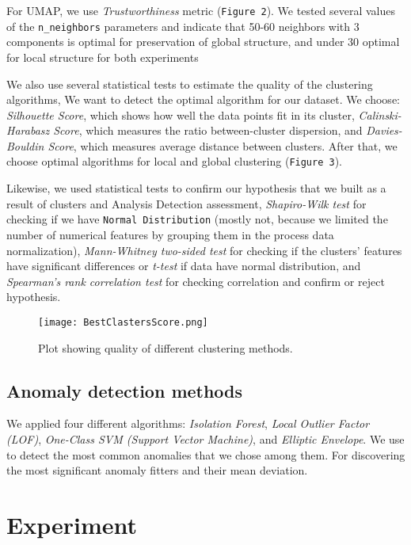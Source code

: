 \documentclass[12pt, a4paper]{article}
\begin{document}
For UMAP, we use \textit{Trustworthiness} metric (\texttt{Figure 2}). We tested several values of the \texttt{n\_neighbors} parameters and indicate that 50-60 neighbors with 3 components is optimal for preservation of global structure, and under 30 optimal for local structure for both experiments

We also use several statistical tests to estimate the quality of the clustering algorithms, We want to detect the optimal algorithm for our dataset. We choose:   \textit{Silhouette Score}, which shows how well the data points fit in its cluster,  \textit{Calinski-Harabasz Score}, which measures the ratio between-cluster dispersion, and \textit{Davies-Bouldin Score}, which measures average distance between clusters. After that, we choose optimal algorithms for local and global clustering (\texttt{Figure 3}). 

Likewise, we used statistical tests to confirm our hypothesis that we built as a result of clusters and Analysis Detection assessment, \textit{Shapiro-Wilk test} for checking if we have \texttt{Normal Distribution} (mostly not, because we limited the number of numerical features by grouping them in the process data normalization), \textit{Mann-Whitney two-sided test} for checking if the clusters' features have significant differences or \textit{t-test} if data have normal distribution, and \textit{Spearman's rank correlation test} for checking correlation and confirm or reject hypothesis.
\begin{figure}[htbp]
    \centering
    \texttt{[image: BestClastersScore.png]}
    \caption{Plot showing quality of different clustering methods.}
    \label{fig:scree_BestClaster}
\end{figure}
\subsection{Anomaly detection methods}
\hspace*{1em}
We applied four different algorithms: \textit{Isolation Forest},  \textit{Local Outlier Factor (LOF)}, \textit{One-Class SVM (Support Vector Machine)}, and \textit{Elliptic Envelope}. We use to detect the most common anomalies that we chose among them. For discovering the most significant anomaly fitters and their mean deviation. 

\section{Experiment}
\end{document}
